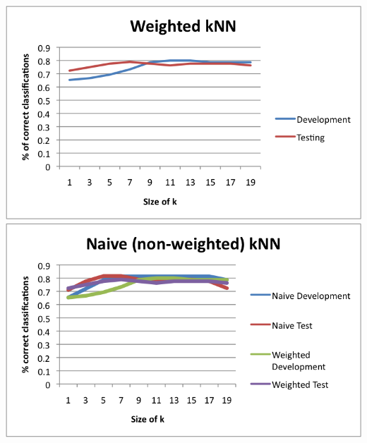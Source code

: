 \documentclass[fleqn]{article}
\begin{document}
\begin{solution}
\includegraphics[scale=0.8]{Weighted.png}
\includegraphics[scale=0.8]{Comparison.png}
\end{solution}

\ene
\end{document}
